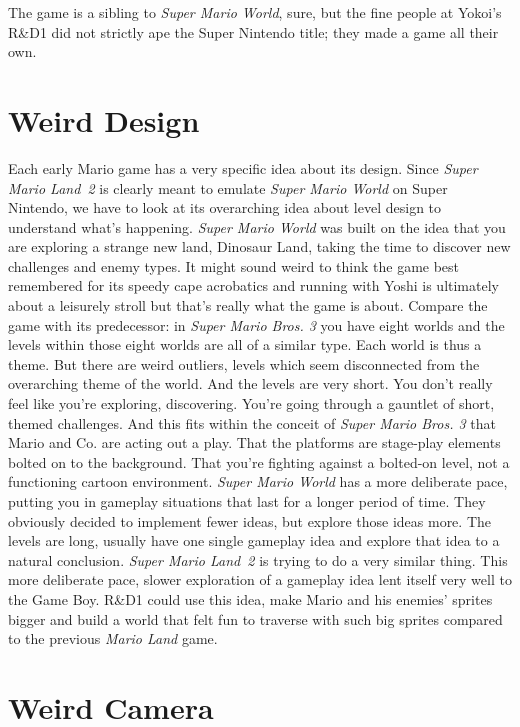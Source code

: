 \documentclass{book}
\begin{document}
The game is a sibling to \emph{Super Mario World}, sure, but the fine people at Yokoi’s R\&D1 did not strictly ape the Super Nintendo title; they made a game all their own.

\FloatBarrier\needspace{10mm}\section*{Weird Design}\nopagebreak[4]

Each early Mario game has a very specific idea about its design. Since \emph{Super Mario Land 2} is clearly meant to emulate \emph{Super Mario World} on Super Nintendo, we have to look at its overarching idea about level design to understand what’s happening. \emph{Super Mario World} was built on the idea that you are exploring a strange new land, Dinosaur Land, taking the time to discover new challenges and enemy types. It might sound weird to think the game best remembered for its speedy cape acrobatics and running with Yoshi is ultimately about a leisurely stroll but that’s really what the game is about. Compare the game with its predecessor: in \emph{Super Mario Bros. 3} you have eight worlds and the levels within those eight worlds are all of a similar type. Each world is thus a theme. But there are weird outliers, levels which seem disconnected from the overarching theme of the world. And the levels are very short. You don’t really feel like you’re exploring, discovering. You’re going through a gauntlet of short, themed challenges. And this fits within the conceit of \emph{Super Mario Bros. 3} that Mario and Co. are acting out a play. That the platforms are stage-play elements bolted on to the background. That you’re fighting against a bolted-on level, not a functioning cartoon environment. \emph{Super Mario World} has a more deliberate pace, putting you in gameplay situations that last for a longer period of time. They obviously decided to implement fewer ideas, but explore those ideas more. The levels are long, usually have one single gameplay idea and explore that idea to a natural conclusion. \emph{Super Mario Land 2} is trying to do a very similar thing. This more deliberate pace, slower exploration of a gameplay idea lent itself very well to the Game Boy. R\&D1 could use this idea, make Mario and his enemies’ sprites bigger and build a world that felt fun to traverse with such big sprites compared to the previous \emph{Mario Land} game.

\FloatBarrier\needspace{10mm}\section*{Weird Camera}\nopagebreak[4]
\end{document}
